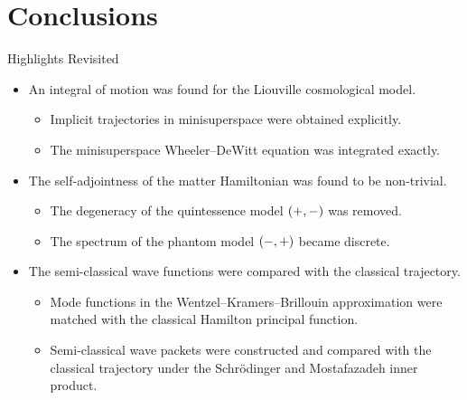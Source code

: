 \documentclass[8pt]{beamer}
\begin{document}
\section{Conclusions}

\begin{frame}%
{Highlights}%
{Revisited}
\begin{itemize}
\item An \alert{integral of motion} was found for the Liouville cosmological
model.
\begin{itemize}
\item Implicit trajectories in minisuperspace were obtained explicitly.
\item The minisuperspace Wheeler--DeWitt equation was integrated exactly.
\end{itemize}
\item The \alert{self-adjointness} of the matter Hamiltonian was found to be 
non-trivial.
\begin{itemize}
\item The degeneracy of the quintessence model ${\left(+,-\right)}$ was removed.
\item The spectrum of the phantom model ${\left(-,+\right)}$ became discrete.
\end{itemize}
\item The \alert{semi-classical wave functions} were compared with the 
classical trajectory.
\begin{itemize}
\item Mode functions in the Wentzel--Kramers--Brillouin approximation were 
matched with the classical Hamilton principal function.
\item Semi-classical wave packets were constructed and compared with the 
classical trajectory under the Schrödinger and Mostafazadeh inner product.
\end{itemize}
\end{itemize}
\end{frame}

\end{document}
